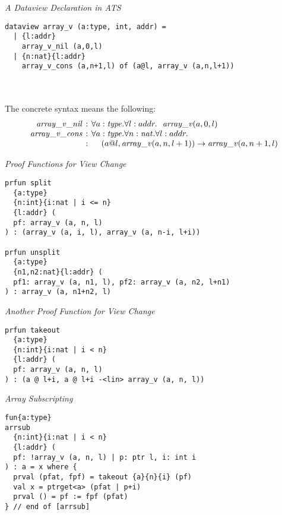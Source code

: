 \documentclass[pdf]{prosper}
\begin{document}
\def\cArrayCons{{\it array\_v\_cons}}
\begin{slide}{\em A Dataview Declaration in ATS}
{\blue\begin{verbatim}
dataview array_v (a:type, int, addr) =
  | {l:addr}
    array_v_nil (a,0,l)
  | {n:nat}{l:addr}
    array_v_cons (a,n+1,l) of (a@l, array_v (a,n,l+1))
\end{verbatim}}~\\~\\
The concrete syntax means the following:
\[\begin{array}{rcl}
\cArrayNil  &\kern-6pt:\kern-6pt& \forall a:\stype.\forall l:addr.~~\varrayView(a,0,l) \\
\cArrayCons &\kern-6pt:\kern-6pt& \forall a:\stype.\forall n:\snat.\forall l:addr. \\
            &\kern-6pt:\kern-6pt& \kern12pt (a@l, \varrayView(a,n,l+1))\timp\varrayView(a,n+1,l) \\
\end{array}\]
\end{slide}
\begin{slide}{\em Proof Functions for View Change}
{\blue\begin{verbatim}
prfun split
  {a:type}
  {n:int}{i:nat | i <= n}
  {l:addr} (
  pf: array_v (a, n, l)
) : (array_v (a, i, l), array_v (a, n-i, l+i))

prfun unsplit
  {a:type}
  {n1,n2:nat}{l:addr} (
  pf1: array_v (a, n1, l), pf2: array_v (a, n2, l+n1)
) : array_v (a, n1+n2, l)
\end{verbatim}
}
\end{slide}
\begin{slide}{\em Another Proof Function for View Change}
{\blue\begin{verbatim}
prfun takeout
  {a:type}
  {n:int}{i:nat | i < n}
  {l:addr} (
  pf: array_v (a, n, l)
) : (a @ l+i, a @ l+i -<lin> array_v (a, n, l))
\end{verbatim}
}
\end{slide}
\begin{slide}{\em Array Subscripting}
{\blue\begin{verbatim}
fun{a:type}
arrsub
  {n:int}{i:nat | i < n}
  {l:addr} (
  pf: !array_v (a, n, l) | p: ptr l, i: int i
) : a = x where {
  prval (pfat, fpf) = takeout {a}{n}{i} (pf)
  val x = ptrget<a> (pfat | p+i)
  prval () = pf := fpf (pfat)
} // end of [arrsub]
\end{verbatim}
}
\end{slide}
\end{document}
